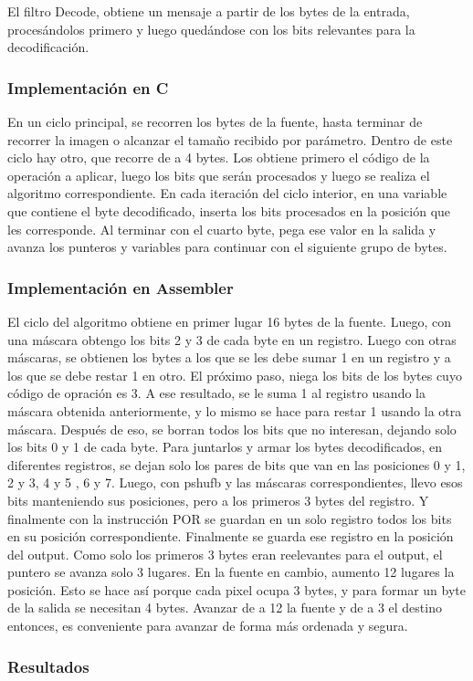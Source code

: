 El filtro Decode, obtiene un mensaje a partir de los bytes de la entrada, proces\'andolos primero y luego qued\'andose con los bits relevantes para la 
decodificaci\'on.

\subsubsection{Implementación en C}
En un ciclo principal, se recorren los bytes de la fuente, hasta terminar de recorrer la imagen o alcanzar el tamaño recibido por par\'ametro. Dentro de 
este ciclo hay otro, que recorre de a 4 bytes. Los obtiene primero el c\'odigo de la operación a aplicar, luego los bits que ser\'an procesados y luego 
se realiza el algoritmo correspondiente. En cada iteraci\'on del ciclo interior, en una variable que contiene el byte decodificado, inserta los bits 
procesados en la posici\'on que les corresponde. Al terminar con el cuarto byte, pega ese valor en la salida y avanza los punteros y variables para 
continuar con el siguiente grupo de bytes.

\subsubsection{Implementación en Assembler}
El ciclo del algoritmo obtiene en primer lugar 16 bytes de la fuente. Luego, con una m\'ascara obtengo los bits 2 y 3 de cada byte en un registro. Luego 
con otras m\'ascaras, se obtienen los bytes a los que se les debe sumar 1 en un registro y a los que se debe restar 1 en otro. El pr\'oximo paso, niega 
los bits de los bytes cuyo c\'odigo de opraci\'on es 3. A ese resultado, se le suma 1 al registro usando la m\'ascara obtenida anteriormente, y lo mismo 
se hace para restar 1 usando la otra m\'ascara. Despu\'es de eso, se borran todos los bits que no interesan, dejando solo los bits 0 y 1 de cada byte.\newline
Para juntarlos y armar los bytes decodificados, en diferentes registros, se dejan solo los pares de bits que van en las posiciones 0 y 1, 2 y 3, 4 y 5 , 
6 y 7. Luego, con pshufb y las m\'ascaras correspondientes, llevo esos bits manteniendo sus posiciones, pero a los primeros 3 bytes del registro. Y 
finalmente con la instrucci\'on POR se guardan en un solo registro todos los bits en su posici\'on correspondiente. Finalmente se guarda ese registro en 
la posición del output. Como solo los primeros 3 bytes eran reelevantes para el output, el puntero se avanza solo 3 lugares. En la fuente en cambio, 
aumento 12 lugares la posici\'on. Esto se hace as\'i porque cada pixel ocupa 3 bytes, y para formar un byte de la salida se necesitan 4 bytes. Avanzar de
 a 12 la fuente y de a 3 el destino entonces, es conveniente para avanzar de forma m\'as ordenada y segura.

\subsubsection{Resultados}
